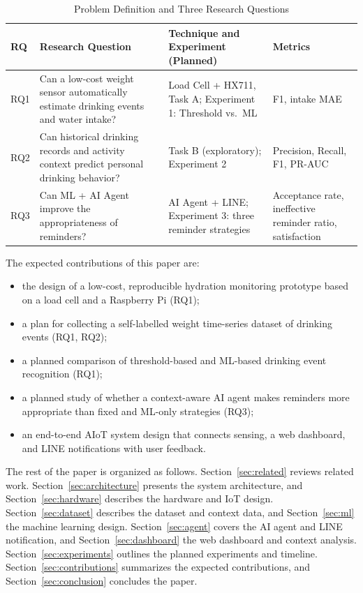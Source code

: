\documentclass[conference]{IEEEtran}
\begin{document}
\begin{table}[htbp]
\caption{Problem Definition and Three Research Questions}
\label{tab:rq}
\centering
\footnotesize
\begin{tabular}{@{}p{}p{}p{}p{}@{}}
\toprule
\textbf{RQ} & \textbf{Research Question} & \textbf{Technique and Experiment (Planned)} & \textbf{Metrics} \\
\midrule
RQ1 & Can a low-cost weight sensor automatically estimate drinking events and water intake? & Load Cell + HX711, Task A; Experiment 1: Threshold vs.\ ML & F1, intake MAE \\
\midrule
RQ2 & Can historical drinking records and activity context predict personal drinking behavior? & Task B (exploratory); Experiment 2 & Precision, Recall, F1, PR-AUC \\
\midrule
RQ3 & Can ML + AI Agent improve the appropriateness of reminders? & AI Agent + LINE; Experiment 3: three reminder strategies & Acceptance rate, ineffective reminder ratio, satisfaction \\
\bottomrule
\end{tabular}
\end{table}

The expected contributions of this paper are:
\begin{itemize}
\item the design of a low-cost, reproducible hydration monitoring prototype based on a load cell and a Raspberry Pi (RQ1);
\item a plan for collecting a self-labelled weight time-series dataset of drinking events (RQ1, RQ2);
\item a planned comparison of threshold-based and ML-based drinking event recognition (RQ1);
\item a planned study of whether a context-aware AI agent makes reminders more appropriate than fixed and ML-only strategies (RQ3);
\item an end-to-end AIoT system design that connects sensing, a web dashboard, and LINE notifications with user feedback.
\end{itemize}

The rest of the paper is organized as follows. Section~\ref{sec:related} reviews related work. Section~\ref{sec:architecture} presents the system architecture, and Section~\ref{sec:hardware} describes the hardware and IoT design. Section~\ref{sec:dataset} describes the dataset and context data, and Section~\ref{sec:ml} the machine learning design. Section~\ref{sec:agent} covers the AI agent and LINE notification, and Section~\ref{sec:dashboard} the web dashboard and context analysis. Section~\ref{sec:experiments} outlines the planned experiments and timeline. Section~\ref{sec:contributions} summarizes the expected contributions, and Section~\ref{sec:conclusion} concludes the paper.
\end{document}
